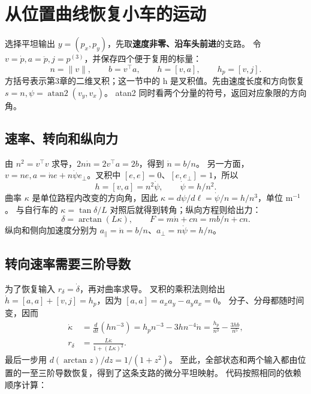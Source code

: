 \section{从位置曲线恢复小车的运动}
选择平坦输出 $y=(p_x,p_y)$，先取\textbf{速度非零、沿车头前进}的支路。
令 $v=\dot p,a=\ddot p,j=p^{(3)}$，并保存四个便于复用的标量：
\begin{equation}
n=\|v\|,\qquad b=v^\top a,\qquad h=[v,a],\qquad h_p=[v,j].
\end{equation}
方括号表示第3章的二维叉积；这一节中的 h 是叉积值。先由速度长度和方向恢复
$s=n,\psi=\operatorname{atan2}(v_y,v_x)$。
atan2 同时看两个分量的符号，返回对应象限的方向角。

\subsection*{速率、转向和纵向力}
由 $n^2=v^\top v$ 求导，$2n\dot n=2v^\top a=2b$，得到 $\dot n=b/n$。
另一方面，$v=ne,a=\dot n e+n\dot\psi e_\perp$。叉积中 $[e,e]=0$、$[e,e_\perp]=1$，所以
\begin{equation}
h=[v,a]=n^2\dot\psi,\qquad \dot\psi=h/n^2.
\end{equation}
曲率 $\kappa$ 是单位路程内改变的方向角，因此
$\kappa=d\psi/d\ell=\dot\psi/n=h/n^3$，单位 m$^{-1}$。
与自行车的 $\kappa=\tan\delta/L$ 对照后就得到转角；纵向方程则给出力：
\begin{equation}
\delta=\arctan(L\kappa),\qquad F=m\dot n+cn=mb/n+cn.
\end{equation}
纵向和侧向加速度分别为 $a_\parallel=\dot n=b/n$、$a_\perp=n\dot\psi=h/n$。

\subsection*{转向速率需要三阶导数}
为了恢复输入 $r_\delta=\dot\delta$，再对曲率求导。
叉积的乘积法则给出 $\dot h=[a,a]+[v,j]=h_p$，因为 $[a,a]=a_xa_y-a_ya_x=0$。
分子、分母都随时间变，因而
\begin{align}
\dot\kappa&=\frac{d}{dt}(hn^{-3})
 =h_pn^{-3}-3hn^{-4}\dot n
 =\frac{h_p}{n^3}-\frac{3hb}{n^5},\\
r_\delta&=\frac{L\dot\kappa}{1+(L\kappa)^2}.
\end{align}
最后一步用 $d(\arctan z)/dz=1/(1+z^2)$。
至此，全部状态和两个输入都由位置的一至三阶导数恢复，得到了这条支路的微分平坦映射。
代码按照相同的依赖顺序计算：
\par\noindent\begin{minipage}{\linewidth}

\end{minipage}\par

